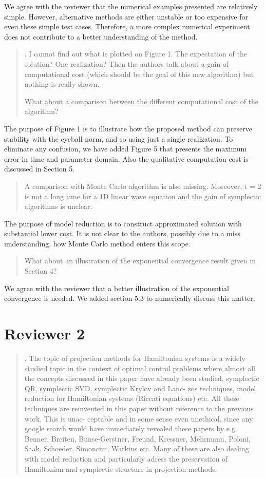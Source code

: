 \documentclass[a4paper]{article}
\newcommand{\breview}{\begin{quotation}\begin{bf}\noindent}
\newcommand{\ereview}{\end{bf}\end{quotation}}
\begin{document}
We agree with the reviewer that the numerical examples presented are relatively simple. However, alternative methods are either unstable or too expensive for even these simple test cases. Therefore, a more complex numerical experiment does not contribute to a better understanding of the method. 


\breview
4. I cannot find out what is plotted on Figure 1. The expectation of the solution? One realization? Then the authors talk about a gain of computational cost (which should be the goal of this new algorithm) but nothing is really shown.

What about a comparison between the different computational cost of the algorithm? 
\ereview

The purpose of Figure 1 is to illustrate how the proposed method can preserve stability with the eyeball norm, and so using just a single realization. To eliminate any confusion, we have added Figure 5 that presents the maximum error in time and parameter domain. Also the qualitative computation cost is discussed in Section 5.

\breview
A comparison with Monte Carlo algorithm is also missing. Moreover, t = 2 is not a long time for a 1D linear wave equation and the gain of symplectic algorithms is unclear. 
\ereview

The purpose of model reduction is to construct approximated solution with substantial lower cost. It is not clear to the authors, possibly due to a miss understanding, how Monte Carlo method enters this scope.

\breview
What about an illustration of the exponential convergence result given in Section 4? 
\ereview

We agree with the reviewer that a better illustration of the exponential convergence is needed. We added section 5.3 to numerically discuss this matter.

\section*{Reviewer 2}

\breview
1. The topic of projection methods for Hamiltonian systems is a widely studied topic in the context of optimal control problems where almost all the concepts discussed in this paper have already been studied, symplectic QR, symplectic SVD, symplectic Krylov and Lanc- zos techniques, model reduction for Hamiltonian systems (Riccati equations) etc. All these techniques are reinvented in this paper without reference to the previous work. This is unac- ceptable and in some sense even unethical, since any google search would have immediately revealed these papers by e.g. Benner, Breiten, Bunse-Gerstner, Freund, Kressner, Mehrmann, Poloni, Saak, Schoeder, Simoncini, Watkins etc. Many of these are also dealing with model reduction and particularly adress the preservation of Hamiltonian and symplectic structure in projection methods.
\ereview
\end{document}
